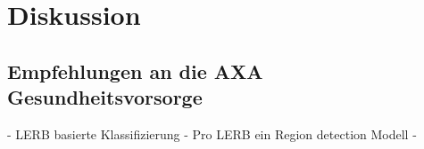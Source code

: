 \section{Diskussion}
\label{chap:summary}

\subsection{Empfehlungen an die AXA Gesundheitsvorsorge}
- LERB basierte Klassifizierung
- Pro LERB ein Region detection Modell
- 